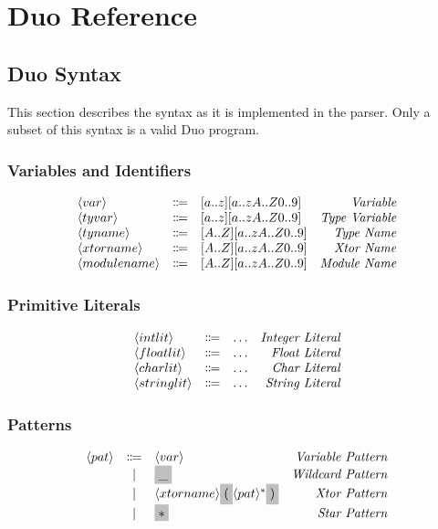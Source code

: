 \documentclass[11pt]{article}
\newcommand{\nonterminal}[1]{\langle #1 \rangle}
\newcommand{\terminal}[1]{\colorbox{lightgray}{\vphantom{X}#1}}
\begin{document}
\section{Duo Reference}

\subsection{Duo Syntax}
This section describes the syntax as it is implemented in the parser.
Only a subset of this syntax is a valid Duo program.

\subsubsection{Variables and Identifiers}
\[
  \begin{array}{lclr}
    \nonterminal{var} & \Coloneqq & [a..z][a..zA..Z0..9] & \emph{Variable} \\
    \nonterminal{tyvar} & \Coloneqq & [a..z][a..zA..Z0..9] & \emph{Type Variable} \\
    \nonterminal{tyname} & \Coloneqq & [A..Z][a..zA..Z0..9] & \emph{Type Name} \\
    \nonterminal{xtorname} & \Coloneqq & [A..Z][a..zA..Z0..9] & \emph{Xtor Name} \\
    \nonterminal{modulename} & \Coloneqq &  [A..Z][a..zA..Z0..9] & \emph{Module Name} \\
  \end{array}
\]

\subsubsection{Primitive Literals}
\[
  \begin{array}{lclr}
    \nonterminal{intlit} & \Coloneqq & \ldots & \emph{Integer Literal} \\
    \nonterminal{floatlit} & \Coloneqq & \ldots & \emph{Float Literal} \\
    \nonterminal{charlit} & \Coloneqq & \ldots & \emph{Char Literal} \\
    \nonterminal{stringlit} & \Coloneqq & \ldots & \emph{String Literal} \\
  \end{array}
\]

\subsubsection{Patterns}
\[
  \begin{array}{lclr}
    \nonterminal{pat} & \Coloneqq & \nonterminal{var} & \emph{Variable Pattern} \\
    & | & \terminal{\_} & \emph{Wildcard Pattern} \\
    & | & \nonterminal{xtorname}\terminal{(}\nonterminal{pat}^{\ast} \terminal{)} & \emph{Xtor Pattern}\\
    & | & \terminal{$\ast$} & \emph{Star Pattern} \\
  \end{array}
\]
\end{document}
